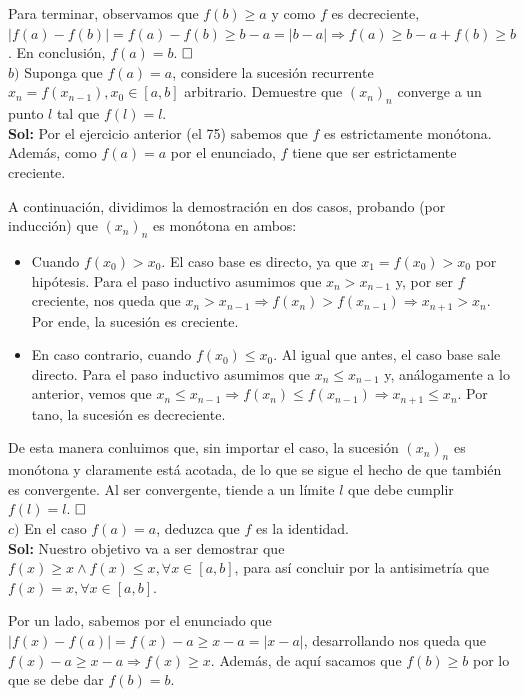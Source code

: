 \documentclass{article}
\begin{document}
Para terminar, observamos que $f(b) \geq a$ y como $f$ es decreciente, $|f(a) - f(b)| = f(a) - f(b) \geq b - a = |b - a| \Longrightarrow f(a) \geq b - a + f(b) \geq b$. En conclusión, $f(a) = b$. $\hfill\square$ \\

$b)$ Suponga que $f(a) = a$, considere la sucesión recurrente $x_n = f(x_{n - 1}), x_0 \in [a, b]$ arbitrario. Demuestre que $(x_n)_n$ converge a un punto $l$ tal que $f(l) = l$. \\

\noindent \textbf{Sol:} Por el ejercicio anterior (el 75) sabemos que $f$ es estrictamente monótona. Además, como $f(a) = a$ por el enunciado, $f$ tiene que ser estrictamente creciente.

A continuación, dividimos la demostración en dos casos, probando (por inducción) que $(x_n)_n$ es monótona en ambos:

\begin{itemize}
    \item Cuando $f(x_0) > x_0$. El caso base es directo, ya que $x_1 = f(x_0) > x_0$ por hipótesis. Para el paso inductivo asumimos que $x_n > x_{n - 1}$ y, por ser $f$ creciente, nos queda que $x_n > x_{n - 1} \Longrightarrow f(x_n) > f(x_{n - 1}) \Longrightarrow x_{n + 1} > x_n$. Por ende, la sucesión es creciente.

    \item En caso contrario, cuando $f(x_0) \leq x_0$. Al igual que antes, el caso base sale directo. Para el paso inductivo asumimos que $x_n \leq x_{n - 1}$ y, análogamente a lo anterior, vemos que $x_n \leq x_{n - 1} \Longrightarrow f(x_n) \leq f(x_{n - 1}) \Longrightarrow x_{n + 1} \leq x_n$. Por tano, la sucesión es decreciente.
\end{itemize}

De esta manera conluimos que, sin importar el caso, la sucesión $(x_n)_n$ es monótona y claramente está acotada, de lo que se sigue el hecho de que también es convergente. Al ser convergente, tiende a un límite $l$ que debe cumplir $f(l) = l$. $\hfill\square$ \\

$c)$ En el caso $f(a) = a$, deduzca que $f$ es la identidad. \\

\noindent\textbf{Sol:} Nuestro objetivo va a ser demostrar que $f(x) \geq x \land f(x) \leq x, \forall x \in [a, b]$, para así concluir por la antisimetría que $f(x) = x, \forall x \in [a, b]$.

Por un lado, sabemos por el enunciado que $|f(x) - f(a)| = f(x) - a \geq x - a = |x - a|$, desarrollando nos queda que $f(x) - a \geq x - a \Longrightarrow f(x) \geq x$. Además, de aquí sacamos que $f(b) \geq b$ por lo que se debe dar $f(b) = b$.
\end{document}
